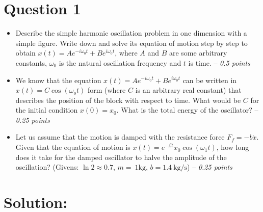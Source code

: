 \section*{Question 1}
\begin{itemize}
    \item [\textbf{(a)}] Describe the simple harmonic oscillation problem in one dimension with a simple figure. Write down and solve its equation of motion step by step to obtain $x(t)=Ae^{-i\omega_0 t}+Be^{i\omega_0 t}$, where $A$ and $B$ are some arbitrary constants, $\omega_0$ is the natural oscillation frequency and $t$ is time. -- \textit{0.5 points}

    \item [\textbf{(b)}] We know that the equation $x(t)=Ae^{-i\omega_0 t}+Be^{i\omega_0 t}$ can be written in $x(t)=C\cos{\left(\omega_o t\right)}$ form (where $C$ is an arbitrary real constant) that describes the position of the block with respect to time. What would be $C$ for the initial condition $x(0)=x_0$. What is the total energy of the oscillator? -- \textit{0.25 points}

    \item [\textbf{(c)}] Let us assume that the motion is damped with the resistance force $F_f=-b\dot{x}$. Given that the equation of motion is $x(t)=e^{-\beta t}x_0\cos{\left(\omega_1 t\right)}$, how long does it take for the damped oscillator to halve the amplitude of the oscillation? (Givens: $\ln2\approx 0.7$, $m=~1\text{kg}$, $b=1.4~\text{kg/s}$) -- \textit{0.25 points}
\end{itemize}

\section*{Solution:}